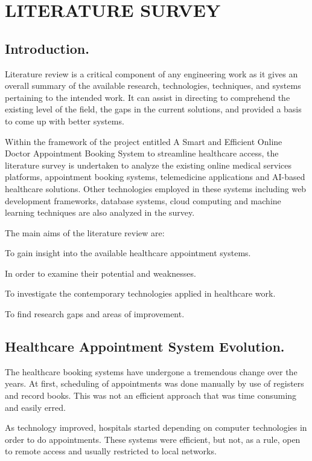 \chapter{LITERATURE SURVEY}

\section{Introduction.}

Literature review is a critical component of any engineering work as it gives an overall summary of the available research, technologies, techniques, and systems pertaining to the intended work. It can assist in directing to comprehend the existing level of the field, the gaps in the current solutions, and provided a basis to come up with better systems.

Within the framework of the project entitled A Smart and Efficient Online Doctor Appointment Booking System to streamline healthcare access, the literature survey is undertaken to analyze the existing online medical services platforms, appointment booking systems, telemedicine applications and AI-based healthcare solutions. Other technologies employed in these systems including web development frameworks, database systems, cloud computing and machine learning techniques are also analyzed in the survey.

The main aims of the literature review are:

To gain insight into the available healthcare appointment systems.

In order to examine their potential and weaknesses.

To investigate the contemporary technologies applied in healthcare work.

To find research gaps and areas of improvement.

\section{Healthcare Appointment System Evolution.}

The healthcare booking systems have undergone a tremendous change over the years. At first, scheduling of appointments was done manually by use of registers and record books. This was not an efficient approach that was time consuming and easily erred.

As technology improved, hospitals started depending on computer technologies in order to do appointments. These systems were efficient, but not, as a rule, open to remote access and usually restricted to local networks.


